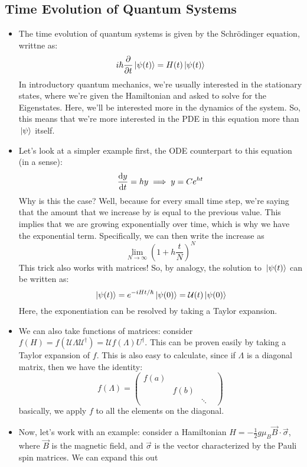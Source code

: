 \subsection{Time Evolution of Quantum Systems}
\begin{itemize}
	\item The time evolution of quantum systems is given by the Schr\"odinger equation, writtne as: 
		\[
			i \hbar \pdv{t} \ket*{\psi(t)} = H(t) \ket*{\psi(t)}
		\] 
		In introductory quantum mechanics, we're usually interested in the stationary states, where we're 
		given the Hamiltonian and asked to solve for the Eigenstates. Here, we'll be interested more in the 
		dynamics of the system. So, this means that we're more interested in the PDE in this equation more than 
		\( \ket*{\psi} \) itself. 
	\item Let's look at a simpler example first, the ODE counterpart to this equation (in a sense): 
		\[
			\dv{y}{t} = hy \implies y = Ce^{ht}
		\] 
		Why is this the case? Well, because for every small time step, we're saying that the amount that we increase 
		by is equal to the previous value. This implies that we are growing exponentially over time, which 
		is why we have the exponential term. Specifically, we can then write the increase as
		\[
		\lim_{N \to \infty} \left(1 + h \frac{t}{N}\right)^{N}
		\] 
		This trick also works with matrices! So, by analogy, the solution to \( \ket*{\psi(t)} \) can be written as: 
		\[
			\ket*{\psi(t)} = e^{-i H t / \hbar}\ket*{\psi(0)} = \mathcal U(t) \ket*{\psi(0)}
		\] 
		Here, the exponentiation can be resolved by taking a Taylor expansion. 
	\item We can also take functions of matrices: consider \( f(H) = f(\mathcal U \Lambda \mathcal U^\dagger) = 
		\mathcal U f(\Lambda) U^{\dagger}\). This can be proven easily by taking a Taylor expansion of \( f \).
		This is also easy to calculate, since if \( \Lambda \) is a diagonal matrix, then we have the 
		identity: 
		\[
			f(\Lambda) = \begin{pmatrix} f(a) & &&\\
			& f(b) & & \\ & & \ddots & \end{pmatrix} 
		\] 
		basically, we apply \( f \) to all the elements on the diagonal.
	\item Now, let's work with an example: consider a Hamiltonian 
		\( H = -\frac{1}{2}g \mu_B \vec B \cdot \vec \sigma \), where \( \vec B \) is the magnetic field, 
		and \( \vec \sigma \) is the vector characterized by the Pauli spin matrices. We can expand this out 

\end{itemize}
